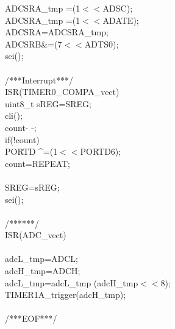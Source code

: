 \documentclass[titlepage, a4paper, 10pt, reqno, openany]{report}
\begin{document}
\begin{minipage}[t]{.3\linewidth}
	\hspace*{.5cm}	ADCSRA\_tmp \textbar =(1$<<$ADSC); \\
	\hspace*{.5cm}	ADCSRA\_tmp \textbar =(1$<<$ADATE); \\
	\hspace*{.5cm}	ADCSRA=ADCSRA\_tmp; \\
	\hspace*{.5cm}	ADCSRB\&=\texttildelow (7$<<$ADTS0); \\
	\hspace*{.5cm}	sei(); \\
	\textbraceright \\
	/***Interrupt***/ \\
	ISR(TIMER0\_COMPA\_vect)\textbraceleft \\
	\hspace*{.5cm}	uint8\_t sREG=SREG; \\
	\hspace*{.5cm}	cli(); \\
	\hspace*{.5cm}	count- -; \\
	\hspace*{.5cm}	if(!count)\textbraceleft \\
	\hspace*{1cm}		PORTD \textasciicircum =(1$<<$PORTD6); \\
	\hspace*{1cm}		count=REPEAT; \\
	\hspace*{.5cm}	\textbraceright \\
	\hspace*{.5cm}	SREG=sREG; \\
	\hspace*{.5cm}	sei(); \\
	\textbraceright \\
	/******/ \\
	ISR(ADC\_vect) \\
	\textbraceleft \\
	\hspace*{.5cm}	adcL\_tmp=ADCL; \\
	\hspace*{.5cm}	adcH\_tmp=ADCH; \\
	\hspace*{.5cm}	adcL\_tmp=adcL\_tmp \textbar (adcH\_tmp$<<$8); \\
	\hspace*{.5cm}	TIMER1A\_trigger(adcH\_tmp); \\
	\textbraceright \\
	/***EOF***/
\end{minipage} \par
\end{document}
